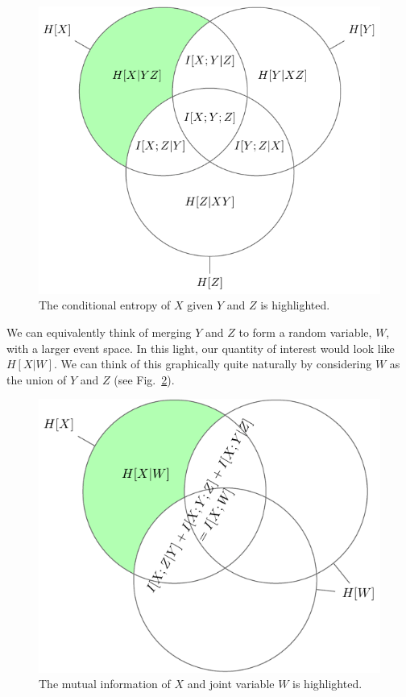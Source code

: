 \begin{figure}[h]
\centering
\includegraphics{../appendix2/figures/tikz/3var/3var_HX_YZ}
\caption{The conditional entropy of $X$ given $Y$ and $Z$ is highlighted.}
\label{fig:3var_HX_YZ}
\end{figure}

 We can equivalently think of merging $Y$ and $Z$ to form a random variable, $W$, with a larger event space. In this light, our quantity of interest would look like $H[X|W]$. We can think of this graphically quite naturally by considering $W$ as the union of $Y$ and $Z$ (see Fig.~\ref{fig:3var_HX_W}).

\begin{figure}[h]
\centering
\includegraphics{../appendix2/figures/tikz/3var/3var_HX_W}
\caption{The mutual information of $X$ and joint variable $W$ is highlighted.}
\label{fig:3var_HX_W}
\end{figure}

